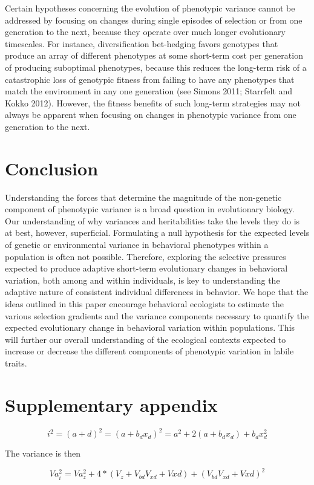 \documentclass{article}
\begin{document}
\noindent Certain hypotheses concerning the evolution of phenotypic variance cannot be addressed by focusing on changes during single episodes of selection or from one generation to the next, because they operate over much longer evolutionary timescales. For instance, diversification bet-hedging favors genotypes that produce an array of different phenotypes at some short-term cost per generation of producing suboptimal phenotypes, because this reduces the long-term risk of a catastrophic loss of genotypic fitness from failing to have any phenotypes that match the environment in any one generation (see Simons 2011; Starrfelt and Kokko 2012). However, the fitness benefits of such long-term strategies may not always be apparent when focusing on changes in phenotypic variance from one generation to the next.

\noindent 
\section{Conclusion}
Understanding the forces that determine the magnitude of the non-genetic component of phenotypic variance is a broad question in evolutionary biology. Our understanding of why variances and heritabilities take the levels they do is at best, however, superficial. Formulating a null hypothesis for the expected levels of genetic or environmental variance in behavioral phenotypes within a population is often not possible. Therefore, exploring the selective pressures expected to produce adaptive short-term evolutionary changes in behavioral variation, both among and within individuals, is key to understanding the adaptive nature of consistent individual differences in behavior. We hope that the ideas outlined in this paper encourage behavioral ecologists to estimate the various selection gradients and the variance components necessary to quantify the expected evolutionary change in behavioral variation within populations. This will further our overall understanding of the ecological contexts expected to increase or decrease the different components of phenotypic variation in labile traits.




\section{Supplementary appendix}
\begin{equation} \label{eq:decomp4}
i^2 = (a + d)^2= (a + b_d x_d)^2 = a^2 + 2(a + b_d x_d) + b_d x_d^2  
\end{equation}

The variance is then 

\begin{equation} \label{eq:variancesquared}
Va_i^2 = Va_z^2 + 4*(V_z + V_{bd}V_{xd} + Vxd) + (V_{bd}V_{xd} + Vxd)^2   
\end{equation}
\end{document}
